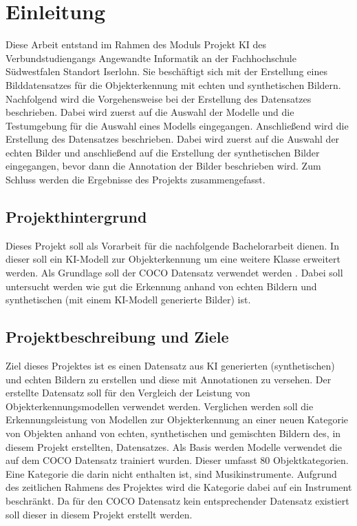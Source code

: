 \section{Einleitung}
Diese Arbeit entstand im Rahmen des Moduls Projekt KI des Verbundstudiengangs Angewandte Informatik an der Fachhochschule Südwestfalen Standort Iserlohn. Sie beschäftigt sich mit der Erstellung eines Bilddatensatzes für die Objekterkennung mit echten und synthetischen Bildern. Nachfolgend wird die Vorgehensweise bei der Erstellung des Datensatzes beschrieben. Dabei wird zuerst auf die Auswahl der Modelle und die Testumgebung für die Auswahl eines Modells eingegangen. Anschließend wird die Erstellung des Datensatzes beschrieben. Dabei wird zuerst auf die Auswahl der echten Bilder und anschließend auf die Erstellung der synthetischen Bilder eingegangen, bevor dann die Annotation der Bilder beschrieben wird. Zum Schluss werden die Ergebnisse des Projekts zusammengefasst.

\subsection{Projekthintergrund}
Dieses Projekt soll als Vorarbeit für die nachfolgende Bachelorarbeit dienen. In dieser soll ein KI-Modell zur Objekterkennung um eine weitere Klasse erweitert werden. Als Grundlage soll der COCO Datensatz verwendet werden \cite{coco2015}. Dabei soll untersucht werden wie gut die Erkennung anhand von echten Bildern und synthetischen (mit einem KI-Modell generierte Bilder) ist.

\subsection{Projektbeschreibung und Ziele}
Ziel dieses Projektes ist es einen Datensatz aus KI generierten (synthetischen) und echten Bildern zu erstellen und diese mit Annotationen zu versehen. Der erstellte Datensatz soll für den Vergleich der Leistung von Objekterkennungsmodellen verwendet werden. Verglichen werden soll die Erkennungsleistung von Modellen zur Objekterkennung an einer neuen Kategorie von Objekten anhand von echten, synthetischen und gemischten Bildern des, in diesem Projekt erstellten, Datensatzes. Als Basis werden Modelle verwendet die auf dem COCO Datensatz \cite{coco2015} trainiert wurden. Dieser umfasst 80 Objektkategorien. Eine Kategorie die darin nicht enthalten ist, sind Musikinstrumente. Aufgrund des zeitlichen Rahmens des Projektes wird die Kategorie dabei auf ein Instrument beschränkt. Da für den COCO Datensatz kein entsprechender Datensatz existiert soll dieser in diesem Projekt erstellt werden.

